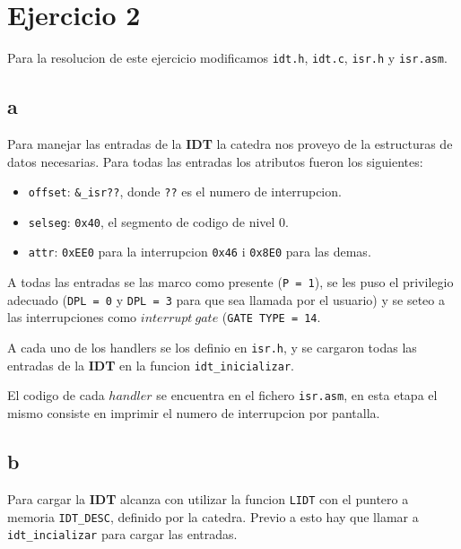 \section{Ejercicio 2}

Para la resolucion de este ejercicio modificamos \texttt{idt.h}, \texttt{idt.c}, \texttt{isr.h} y \texttt{isr.asm}.

\subsection{a}

Para manejar las entradas de la \textbf{IDT} la catedra nos proveyo de la estructuras de datos necesarias. Para todas las entradas los atributos fueron los siguientes:

\begin{itemize}
\item \texttt{offset}: \texttt{\&\_isr??}, donde \texttt{??} es el numero de interrupcion.
\item \texttt{selseg}: \texttt{0x40}, el segmento de codigo de nivel 0.
\item \texttt{attr}: \texttt{0xEE0} para la interrupcion \texttt{0x46} i \texttt{0x8E0} para las demas.
\end{itemize}

A todas las entradas se las marco como presente (\texttt{P = 1}), se les puso el privilegio adecuado (\texttt{DPL = 0} y \texttt{DPL = 3} para que sea llamada por el usuario) y se seteo a las interrupciones como $interrupt\ gate$ (\texttt{GATE TYPE = 14}.

A cada uno de los handlers se los definio en \texttt{isr.h}, y se cargaron todas las entradas de la \textbf{IDT} en la funcion \texttt{idt\_inicializar}.

El codigo de cada $handler$ se encuentra en el fichero \texttt{isr.asm}, en esta etapa el mismo consiste en imprimir el numero de interrupcion por pantalla.

\subsection{b}

Para cargar la \textbf{IDT} alcanza con utilizar la funcion \texttt{LIDT} con el puntero a memoria \texttt{IDT\_DESC}, definido por la catedra. Previo a esto hay que llamar a \texttt{idt\_incializar} para cargar las entradas.